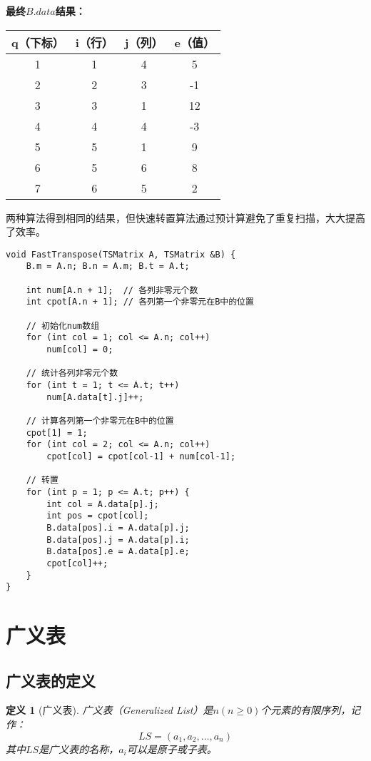 \documentclass[12pt,a4paper]{amsart}
\newtheorem{definition}{定义}[section]
\begin{document}
\textbf{最终$B.data$结果：}

\begin{center}
\begin{tabular}{|c|c|c|c|}
\hline
q（下标） & i（行） & j（列） & e（值） \\
\hline
1 & 1 & 4 & 5 \\
2 & 2 & 3 & -1 \\
3 & 3 & 1 & 12 \\
4 & 4 & 4 & -3 \\
5 & 5 & 1 & 9 \\
6 & 5 & 6 & 8 \\
7 & 6 & 5 & 2 \\
\hline
\end{tabular}
\end{center}

两种算法得到相同的结果，但快速转置算法通过预计算避免了重复扫描，大大提高了效率。

\begin{lstlisting}[caption=快速转置算法C++实现]
void FastTranspose(TSMatrix A, TSMatrix &B) {
    B.m = A.n; B.n = A.m; B.t = A.t;
    
    int num[A.n + 1];  // 各列非零元个数
    int cpot[A.n + 1]; // 各列第一个非零元在B中的位置
    
    // 初始化num数组
    for (int col = 1; col <= A.n; col++)
        num[col] = 0;
    
    // 统计各列非零元个数
    for (int t = 1; t <= A.t; t++)
        num[A.data[t].j]++;
    
    // 计算各列第一个非零元在B中的位置
    cpot[1] = 1;
    for (int col = 2; col <= A.n; col++)
        cpot[col] = cpot[col-1] + num[col-1];
    
    // 转置
    for (int p = 1; p <= A.t; p++) {
        int col = A.data[p].j;
        int pos = cpot[col];
        B.data[pos].i = A.data[p].j;
        B.data[pos].j = A.data[p].i;
        B.data[pos].e = A.data[p].e;
        cpot[col]++;
    }
}
\end{lstlisting}

\section{广义表}

\subsection{广义表的定义}

\begin{definition}[广义表]
广义表（Generalized List）是$n(n \geq 0)$个元素的有限序列，记作：
$$LS = (a_1, a_2, \ldots, a_n)$$
其中$LS$是广义表的名称，$a_i$可以是原子或子表。
\end{definition}
\end{document}

